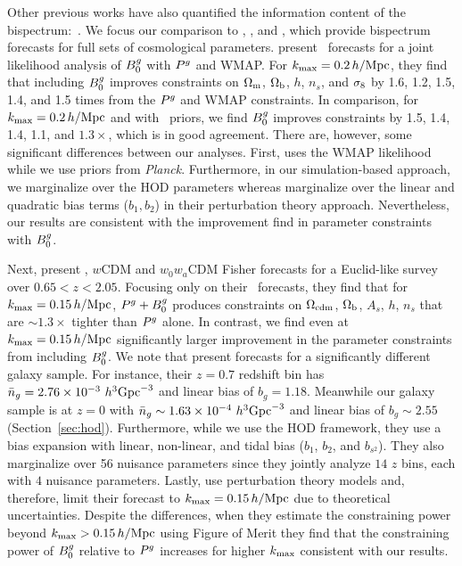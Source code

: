 Other previous works have also quantified the information content of the
bispectrum:~\citep[\eg][]{scoccimarro2004, sefusatti2006, sefusatti2007,
song2015, tellarini2016, yamauchi2017a, karagiannis2018, yankelevich2019,
chudaykin2019, coulton2019, reischke2019, agarwal2020}. 
We focus our comparison to \cite{sefusatti2006}, \cite{yankelevich2019},
\cite{agarwal2020} and \cite{chudaykin2019}, which provide bispectrum forecasts for 
full sets of cosmological parameters.
\cite{sefusatti2006} present \lcdm~forecasts for a joint likelihood analysis of
$B^g_0$ with $P^g$ and WMAP. For $k_{\rm max} = 0.2\,h/\mathrm{Mpc}$, they find that including
$B^g_0$ improves constraints on $\Omega_{\rm m}$, $\Omega_{\rm b}$, $h$, $n_s$, and $\sigma_8$ by 1.6, 1.2,
1.5, 1.4, and 1.5 times from the $P^g$ and WMAP constraints. In comparison, for 
$k_{\rm max} = 0.2\,h/\mathrm{Mpc}$ and with \planck~priors, we find $B^g_0$ improves constraints
by  1.5, 1.4, 1.4, 1.1, and $1.3\times$, which is in good agreement. There are,
however, some significant differences between our analyses. First, \cite{sefusatti2006} 
uses the WMAP likelihood while we use priors from {\em Planck}. Furthermore, 
in our simulation-based approach, we marginalize over the HOD parameters
whereas \cite{sefusatti2006} marginalize over the linear and quadratic bias
terms ($b_1, b_2$) in their perturbation theory approach. Nevertheless, our
results are consistent with the improvement \cite{sefusatti2006} find in
parameter constraints with $B^g_0$. 

Next, \cite{yankelevich2019} present \lcdm, $w$CDM and $w_0w_a$CDM Fisher
forecasts for a Euclid-like survey~\citep{laureijs2011} over $0.65 < z < 2.05$.
Focusing only on their \lcdm~forecasts, they find that for $k_{\rm max} = 0.15\,h/\mathrm{Mpc}$, 
$P^g+B^g_0$ produces constraints on $\Omega_{\rm cdm}$, $\Omega_{\rm b}$, $A_s$, $h$, $n_s$ 
that are ${\sim}1.3\times$ tighter than $P^g$ alone. In contrast, we find even
at $k_{\rm max}=0.15\,h/\mathrm{Mpc}$ significantly larger improvement in the parameter constraints 
from including $B^g_0$. We note that \cite{yankelevich2019} present forecasts for
a significantly different galaxy sample. For instance, their $z = 0.7$ redshift
bin has $\bar{n}_g = 2.76 \times 10^{-3}~h^3{\rm Gpc}^{-3}$ and linear bias of
$b_g = 1.18$. Meanwhile our galaxy sample is at $z=0$ with $\bar{n}_g \sim 1.63\times
10^{-4}~h^3{\rm Gpc}^{-3}$ and linear bias of $b_g \sim 2.55$
(Section~\ref{sec:hod}). Furthermore, while we use the HOD framework, they use
a bias expansion with linear, non-linear, and tidal bias ($b_1$, $b_2$, and
$b_{s^2}$). They also marginalize over 56 nuisance parameters since they
jointly analyze $14$ $z$ bins, each with $4$ nuisance parameters.  Lastly,
\cite{yankelevich2019} use perturbation theory models and, therefore, limit
their forecast to $k_{\rm max} = 0.15\,h/\mathrm{Mpc}$ due
to theoretical uncertainties. Despite the differences, when they estimate the constraining
power beyond $k_{\rm max} > 0.15\,h/\mathrm{Mpc}$ using Figure of Merit they find that the
constraining power of $B^g_0$ relative to $P^g$ increases for higher $k_{\rm max}$
consistent with our results. 

